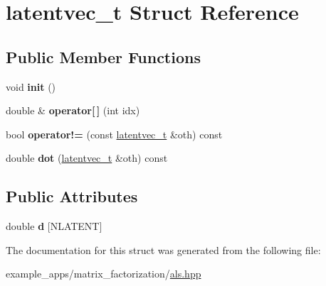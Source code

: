 \hypertarget{structlatentvec__t}{\section{latentvec\-\_\-t Struct Reference}
\label{structlatentvec__t}
}
\subsection*{Public Member Functions}
\begin{DoxyCompactItemize}
\item 
\hypertarget{structlatentvec__t_a59b5ecc4e5c062550b9488e4a9cb7e94}{void {\bfseries init} ()}\label{structlatentvec__t_a59b5ecc4e5c062550b9488e4a9cb7e94}

\item 
\hypertarget{structlatentvec__t_ae0dd358e7caeffdd1ca9a65328117b17}{double \& {\bfseries operator\mbox{[}$\,$\mbox{]}} (int idx)}\label{structlatentvec__t_ae0dd358e7caeffdd1ca9a65328117b17}

\item 
\hypertarget{structlatentvec__t_ab346b7121751756c9aca33c0dbdd77d5}{bool {\bfseries operator!=} (const \hyperlink{structlatentvec__t}{latentvec\-\_\-t} \&oth) const }\label{structlatentvec__t_ab346b7121751756c9aca33c0dbdd77d5}

\item 
\hypertarget{structlatentvec__t_ac8c50f2d93ef5e2d3c4a58321e12d495}{double {\bfseries dot} (\hyperlink{structlatentvec__t}{latentvec\-\_\-t} \&oth) const }\label{structlatentvec__t_ac8c50f2d93ef5e2d3c4a58321e12d495}

\end{DoxyCompactItemize}
\subsection*{Public Attributes}
\begin{DoxyCompactItemize}
\item 
\hypertarget{structlatentvec__t_a6ce42ca776455eb8d37be2b1748d74a4}{double {\bfseries d} \mbox{[}N\-L\-A\-T\-E\-N\-T\mbox{]}}\label{structlatentvec__t_a6ce42ca776455eb8d37be2b1748d74a4}

\end{DoxyCompactItemize}


The documentation for this struct was generated from the following file\-:\begin{DoxyCompactItemize}
\item 
example\-\_\-apps/matrix\-\_\-factorization/\hyperlink{als_8hpp}{als.\-hpp}\end{DoxyCompactItemize}
